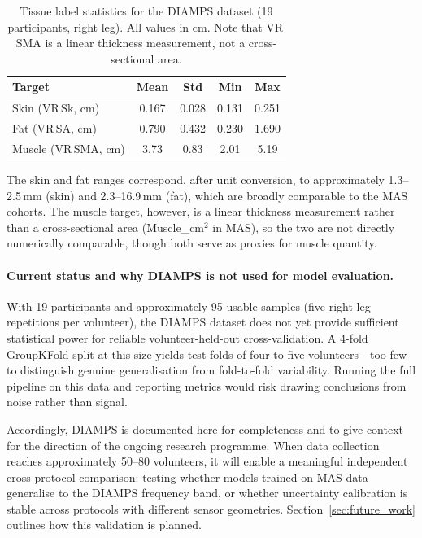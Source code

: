 \documentclass[12pt, a4paper, oneside]{report}
\begin{document}
\begin{table}[H]
  \centering
  \caption{Tissue label statistics for the DIAMPS dataset (19 participants, right leg). All values in cm. Note that VR\,SMA is a linear thickness measurement, not a cross-sectional area.}
  \label{tab:diamps_stats}
  \begin{tabular}{lcccc}
    \toprule
    \textbf{Target} & \textbf{Mean} & \textbf{Std} & \textbf{Min} & \textbf{Max} \\
    \midrule
    Skin (VR\,Sk, cm)    & 0.167 & 0.028 & 0.131 & 0.251 \\
    Fat  (VR\,SA, cm)    & 0.790 & 0.432 & 0.230 & 1.690 \\
    Muscle (VR\,SMA, cm) & 3.73  & 0.83  & 2.01  & 5.19  \\
    \bottomrule
  \end{tabular}
\end{table}

The skin and fat ranges correspond, after unit conversion, to approximately 1.3--2.5\,mm (skin) and 2.3--16.9\,mm (fat), which are broadly comparable to the MAS cohorts. The muscle target, however, is a linear thickness measurement rather than a cross-sectional area (Muscle\_cm$^2$ in MAS), so the two are not directly numerically comparable, though both serve as proxies for muscle quantity.

\paragraph{Current status and why DIAMPS is not used for model evaluation.}
With 19 participants and approximately 95 usable samples (five right-leg repetitions per volunteer), the DIAMPS dataset does not yet provide sufficient statistical power for reliable volunteer-held-out cross-validation. A 4-fold GroupKFold split at this size yields test folds of four to five volunteers---too few to distinguish genuine generalisation from fold-to-fold variability. Running the full pipeline on this data and reporting metrics would risk drawing conclusions from noise rather than signal.

Accordingly, DIAMPS is documented here for completeness and to give context for the direction of the ongoing research programme. When data collection reaches approximately 50--80 volunteers, it will enable a meaningful independent cross-protocol comparison: testing whether models trained on MAS data generalise to the DIAMPS frequency band, or whether uncertainty calibration is stable across protocols with different sensor geometries. Section~\ref{sec:future_work} outlines how this validation is planned.
\end{document}
